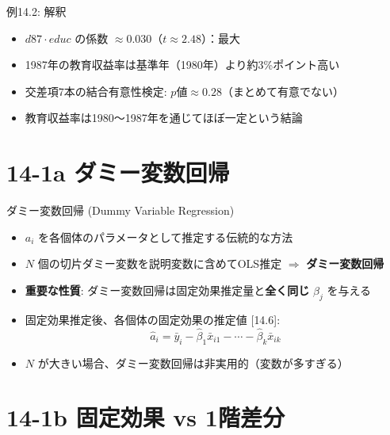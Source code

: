\documentclass[
  ignorenonframetext,
]{beamer}
\providecommand{\tightlist}{%
  \setlength{\itemsep}{0pt}\setlength{\parskip}{0pt}}
\begin{document}
\begin{frame}{例14.2: 解釈}
\label{ux4f8b14.2-ux89e3ux91c8}
\begin{itemize}
\tightlist
\item
  \(d87 \cdot educ\) の係数
  \(\approx 0.030\)（\(t \approx 2.48\)）：最大
\item
  1987年の教育収益率は基準年（1980年）より約3\%ポイント高い
\item
  交差項7本の結合有意性検定: \(p値 \approx 0.28\)（まとめて有意でない）
\item
  教育収益率は1980〜1987年を通じてほぼ一定という結論
\end{itemize}
\end{frame}

\section{14-1a
ダミー変数回帰}\label{a-ux30c0ux30dfux30fcux5909ux6570ux56deux5e30}

\begin{frame}{ダミー変数回帰 (Dummy Variable Regression)}
\label{ux30c0ux30dfux30fcux5909ux6570ux56deux5e30-dummy-variable-regression}
\begin{itemize}
\tightlist
\item
  \(a_i\) を各個体のパラメータとして推定する伝統的な方法
\item
  \(N\) 個の切片ダミー変数を説明変数に含めてOLS推定 \(\Rightarrow\)
  \textbf{ダミー変数回帰}
\item
  \textbf{重要な性質}: ダミー変数回帰は固定効果推定量と\textbf{全く同じ}
  \(\hat{\beta}_j\) を与える
\item
  固定効果推定後、各個体の固定効果の推定値 {[}14.6{]}:
  \[\hat{a}_i = \bar{y}_i - \hat{\beta}_1 \bar{x}_{i1} - \cdots - \hat{\beta}_k \bar{x}_{ik}\]
\item
  \(N\) が大きい場合、ダミー変数回帰は非実用的（変数が多すぎる）
\end{itemize}
\end{frame}

\section{14-1b 固定効果 vs
1階差分}\label{b-ux56faux5b9aux52b9ux679c-vs-1ux968eux5deeux5206}
\end{document}
